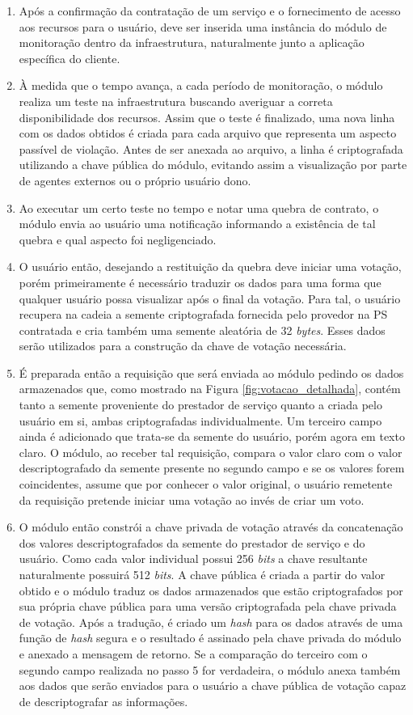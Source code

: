 \begin{enumerate}[label=\textbf{\arabic*})]
    \item Após a confirmação da contratação de um serviço e o fornecimento de acesso aos recursos para o usuário, deve ser inserida uma instância do módulo de monitoração dentro da infraestrutura, naturalmente junto a aplicação específica do cliente.
    \item  À medida que o tempo avança, a cada período de monitoração, o módulo realiza um teste na infraestrutura buscando averiguar a correta disponibilidade dos recursos. Assim que o teste é finalizado, uma nova linha com os dados obtidos é criada para cada arquivo que representa um aspecto passível de violação. Antes de ser anexada ao arquivo, a linha é criptografada utilizando a chave pública do módulo, evitando assim a visualização por parte de agentes externos ou o próprio usuário dono.
    \item Ao executar um certo teste no tempo e notar uma quebra de contrato, o módulo envia ao usuário uma notificação informando a existência de tal quebra e qual aspecto foi negligenciado.
    \item O usuário então, desejando a restituição da quebra deve iniciar uma votação, porém primeiramente é necessário traduzir os dados para uma forma que qualquer usuário possa visualizar após o final da votação. Para tal, o usuário recupera na cadeia a semente criptografada fornecida pelo provedor na \ac{PS} contratada e cria também uma semente aleatória de 32 \textit{bytes}. Esses dados serão utilizados para a construção da chave de votação necessária.
    \item É preparada então a requisição que será enviada ao módulo pedindo os dados armazenados que, como mostrado na Figura \ref{fig:votacao_detalhada}, contém tanto a semente proveniente do prestador de serviço quanto a criada pelo usuário em si, ambas criptografadas individualmente. Um terceiro campo ainda é adicionado que trata-se da semente do usuário, porém agora em texto claro. O módulo, ao receber tal requisição, compara o valor claro com o valor descriptografado da semente presente no segundo campo e se os valores forem coincidentes, assume que por conhecer o valor original, o usuário remetente da requisição pretende iniciar uma votação ao invés de criar um voto.
    \item O módulo então constrói a chave privada de votação através da concatenação dos valores descriptografados da semente do prestador de serviço e do usuário. Como cada valor individual possui 256 \textit{bits} a chave resultante naturalmente possuirá 512 \textit{bits}. A chave pública é criada a partir do valor obtido e o módulo traduz os dados armazenados que estão criptografados por sua própria chave pública para uma versão criptografada pela chave privada de votação. Após a tradução, é criado um \textit{hash} para os dados através de uma função de \textit{hash} segura e o resultado é assinado pela chave privada do módulo e anexado a mensagem de retorno. Se a comparação do terceiro com o segundo campo realizada no passo 5 for verdadeira, o módulo anexa também aos dados que serão enviados para o usuário a chave pública de votação capaz de descriptografar as informações.

\end{enumerate}
